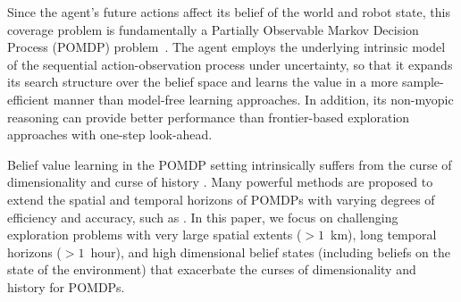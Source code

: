 \documentclass[letterpaper]{article} %
\newcommand{\phdone}[1]{} %
\begin{document}
\phdone{Problem description--POMDP perspective}
Since the agent's future actions affect its belief of the world and robot state, this coverage problem is fundamentally a Partially Observable Markov Decision Process (POMDP) problem~\cite{pomdps_monahan1982}.
The agent employs the underlying intrinsic model of the sequential action-observation process under uncertainty, so that it %
expands its search structure over the belief space and learns the value in a more sample-efficient manner than model-free learning approaches.
In addition, its non-myopic reasoning can provide better performance than frontier-based exploration approaches with one-step look-ahead.

\phdone{Gap in the state-of-the-art}
Belief value learning in the POMDP setting intrinsically suffers from the curse of dimensionality \cite{KLC98} and curse of history \cite{Pineau03}. Many powerful methods are proposed to extend the spatial and temporal horizons of POMDPs with varying degrees of efficiency and accuracy, such as \cite{silver2010monte,somani2013despot,bonet1998learning,kim2019pomhdp}. In this paper, we focus on challenging exploration problems with very large spatial extents ($>\!\!1$~km), long temporal horizons ($>\!\!1$~hour), and high dimensional belief states (including beliefs on the state of the environment) that exacerbate the curses of dimensionality and history for POMDPs. %
%
\end{document}
